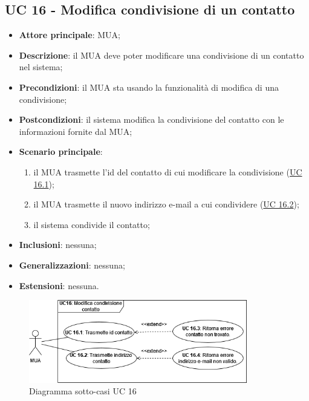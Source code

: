 \subsection{UC 16 - Modifica condivisione di un contatto} \label{sec:UC16}

    \begin{itemize}
        \item \textbf{Attore principale}: MUA;
        \item \textbf{Descrizione}: il MUA deve poter modificare una condivisione di un contatto nel sistema;
        \item \textbf{Precondizioni}: il MUA sta usando la funzionalità di modifica di una condivisione;
        \item \textbf{Postcondizioni}: il sistema modifica la condivisione del contatto con le informazioni fornite dal MUA;
        \item \textbf{Scenario principale}:
            \begin{enumerate}
                \item il MUA trasmette l'id del contatto di cui modificare la condivisione (\hyperref[sec:UC16.1]{UC 16.1});
                \item il MUA trasmette il nuovo indirizzo e-mail a cui condividere (\hyperref[sec:UC16.2]{UC 16.2});
                \item il sistema condivide il contatto;
            \end{enumerate}
        \item \textbf{Inclusioni}: nessuna;
        \item \textbf{Generalizzazioni}: nessuna;
        \item \textbf{Estensioni}: nessuna.
    \end{itemize}

    \begin{figure}[H]
        \includegraphics[width=0.85\textwidth]{sections/uc_imgs/UC16.png}
        \centering
        \caption{Diagramma sotto-casi UC 16}
    \end{figure}

